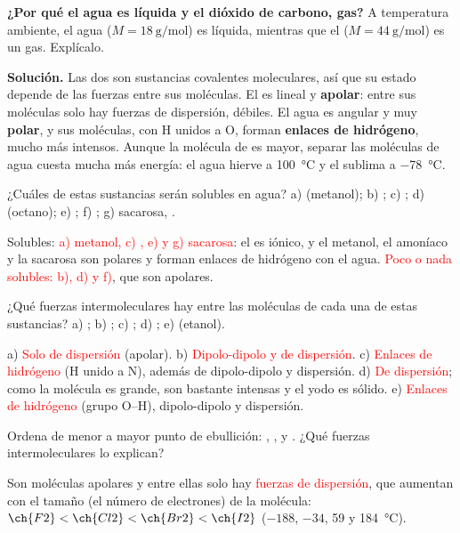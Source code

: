 \begin{example}
    \textbf{¿Por qué el agua es líquida y el dióxido de carbono, gas?} A temperatura ambiente, el agua (\(M = \qty{18}{\gram\per\mol}\))
    es líquida, mientras que el  (\(M = \qty{44}{\gram\per\mol}\)) es un gas. Explícalo.

    \textbf{Solución.} Las dos son sustancias covalentes moleculares, así que su estado depende de las fuerzas entre sus moléculas.
    El  es lineal y \textbf{apolar}: entre sus moléculas solo hay fuerzas de dispersión, débiles. El agua es angular y muy
    \textbf{polar}, y sus moléculas, con H unidos a O, forman \textbf{enlaces de hidrógeno}, mucho más intensos. Aunque la
    molécula de  es mayor, separar las moléculas de agua cuesta mucha más energía: el agua hierve a
    \qty{100}{\degreeCelsius} y el  sublima a \qty{-78}{\degreeCelsius}.
\end{example}

\begin{exercise}
    ¿Cuáles de estas sustancias serán solubles en agua? a)  (metanol); b) ; c) ; d)  (octano);
    e) ; f) ; g) sacarosa, .
    \begin{solu}
        Solubles: \textcolor{red}{a) metanol, c) , e)  y g) sacarosa}: el  es iónico, y el metanol, el
        amoníaco y la sacarosa son polares y forman enlaces de hidrógeno con el agua. \textcolor{red}{Poco o nada solubles: b),
        d) y f)}, que son apolares.
    \end{solu}
\end{exercise}

\begin{exercise}
    ¿Qué fuerzas intermoleculares hay entre las moléculas de cada una de estas sustancias? a) ; b) ; c) ;
    d) ; e)  (etanol).
    \begin{solu}
        a) \textcolor{red}{Solo de dispersión} (apolar). b) \textcolor{red}{Dipolo-dipolo y de dispersión}. c) \textcolor{red}{Enlaces
        de hidrógeno} (H unido a N), además de dipolo-dipolo y dispersión. d) \textcolor{red}{De dispersión}; como la molécula es
        grande, son bastante intensas y el yodo es sólido. e) \textcolor{red}{Enlaces de hidrógeno} (grupo O--H), dipolo-dipolo y
        dispersión.
    \end{solu}
\end{exercise}

\begin{exercise}
    Ordena de menor a mayor punto de ebullición: , ,  y . ¿Qué fuerzas intermoleculares lo explican?
    \begin{solu}
        Son moléculas apolares y entre ellas solo hay \textcolor{red}{fuerzas de dispersión}, que aumentan con el tamaño (el número
        de electrones) de la molécula: \textcolor{red}{\(\ch{F2} < \ch{Cl2} < \ch{Br2} < \ch{I2}\)} (\(-188\), \(-34\), 59 y
        \qty{184}{\degreeCelsius}).
    \end{solu}
\end{exercise}

